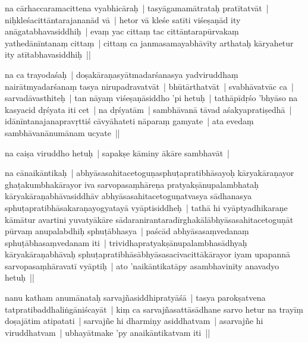 \documentclass[article,12pt,a4paper]{memoir}%
\newcounter{parCount}
\begin{document}
	  \pstart \leavevmode%
	\label{thakur75-3.12}na cārhaccaramacittena vyabhicāraḥ | tasyāgamamātrataḥ pratītatvāt | niḥkleśacittāntarajananād vā | hetor vā kleśe satīti viśeṣaṇād ity anāgatabhavasiddhiḥ | evaṃ yac cittaṃ tac cittāntarapūrvakaṃ yathedānīntanaṃ cittaṃ | cittaṃ ca janmasamayabhāvīty arthataḥ kāryahetur ity atītabhavasiddhiḥ || 
	{}
	\pend%
      

	  \pstart \leavevmode%
	\label{thakur75-3.15}na ca trayodaśaḥ | doṣakāraṇasyātmadarśanasya yadviruddhaṃ nairātmyadarśanaṃ tasya nirupadravatvāt | bhūtārthatvāt | svabhāvatvāc ca | sarvadāvasthiteḥ | tan nāyaṃ viśeṣaṇāsiddho 'pi hetuḥ | tathāpīdṛśo 'bhyāso na kasyacid dṛśyata iti cet | na dṛśyatām | sambhāvanā tāvad aśakyapratiṣedhā | idānīntanajanapravṛttiś cāvyāhateti nāparaṃ gamyate | ata evedaṃ sambhāvanānumānam ucyate || 
	{}
	\pend%
      

	  \pstart \leavevmode%
	\label{thakur75-3.20}na caiṣa viruddho hetuḥ | sapakṣe kāminy ākāre sambhavāt | 
	{}
	\pend%
      

	  \pstart \leavevmode%
	na cānaikāntikaḥ | abhyāsasahitacetoguṇasphuṭapratibhāsayoḥ kāryakāraṇayor ghaṭakumbhakārayor iva sarvopasaṃhāreṇa pratyakṣānupalambhataḥ kāryakāraṇabhāvasiddhāv abhyāsasahitacetoguṇatvasya sādhanasya sphuṭapratibhāsakaraṇayogyatayā vyāptisiddheḥ | tathā hi vyāptyadhikaraṇe kāmātur avartini yuvatyākāre sādaranirantaradīrghakālābhyāsasahitacetoguṇāt pūrvaṃ anupalabdhiḥ sphuṭābhasya | paścād abhyāsasaṃvedanaṃ sphuṭābhasaṃvedanam iti | trividhapratyakṣānupalambhasādhyaḥ kāryakāraṇabhāvaḥ sphuṭapratibhāsābhyāsasacivacittākārayor iyam upapannā sarvopasaṃhāravatī vyāptiḥ | ato 'naikāntikatāpy asambhavinīty anavadyo hetuḥ || 
	{}
	\pend%
      

	  \pstart \leavevmode%
	\label{thakur75-3.29}nanu katham anumānataḥ sarvajñasiddhipratyāśā | tasya parokṣatvena tatpratibaddhaliṅgāniścayāt | kiṃ ca sarvajñasattāsādhane sarvo hetur na trayīṃ doṣajātim atipatati | sarvajñe hi dharmiṇy asiddhatvam | asarvajñe hi viruddhatvam | ubhayātmake 'py anaikāntikatvam iti || 
	{}
	\pend%
      
\end{document}
